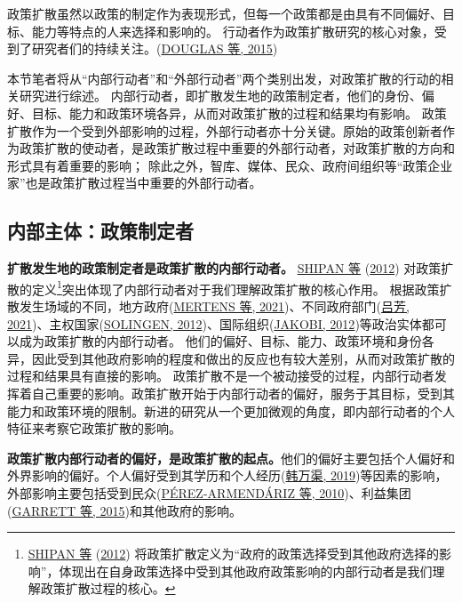 \documentclass[
  12pt,
]{ctexart}
\begin{document}
政策扩散虽然以政策的制定作为表现形式，但每一个政策都是由具有不同偏好、目标、能力等特点的人来选择和影响的。
行动者作为政策扩散研究的核心对象，受到了研究者们的持续关注。(\protect\hyperlink{ref-DouglasEtAl2015}{DOUGLAS 等, 2015})

本节笔者将从``内部行动者''和``外部行动者''两个类别出发，对政策扩散的行动的相关研究进行综述。
内部行动者，即扩散发生地的政策制定者，他们的身份、偏好、目标、能力和政策环境各异，从而对政策扩散的过程和结果均有影响。
政策扩散作为一个受到外部影响的过程，外部行动者亦十分关键。原始的政策创新者作为政策扩散的使动者，是政策扩散过程中重要的外部行动者，对政策扩散的方向和形式具有着重要的影响；
除此之外，智库、媒体、民众、政府间组织等``政策企业家''也是政策扩散过程当中重要的外部行动者。

\hypertarget{ux5185ux90e8ux4e3bux4f53ux653fux7b56ux5236ux5b9aux8005}{%
\subsection{内部主体：政策制定者}\label{ux5185ux90e8ux4e3bux4f53ux653fux7b56ux5236ux5b9aux8005}}

\textbf{扩散发生地的政策制定者是政策扩散的内部行动者。}
\protect\hyperlink{ref-ShipanVolden2012}{SHIPAN 等} (\protect\hyperlink{ref-ShipanVolden2012}{2012}) 对政策扩散的定义\footnote{\protect\hyperlink{ref-ShipanVolden2012}{SHIPAN 等} (\protect\hyperlink{ref-ShipanVolden2012}{2012}) 将政策扩散定义为``政府的政策选择受到其他政府选择的影响''，体现出在自身政策选择中受到其他政府政策影响的内部行动者是我们理解政策扩散过程的核心。}突出体现了内部行动者对于我们理解政策扩散的核心作用。
根据政策扩散发生场域的不同，地方政府(\protect\hyperlink{ref-MertensEtAl2021}{MERTENS 等, 2021})、不同政府部门(\protect\hyperlink{ref-LuFang2021}{吕芳, 2021})、主权国家(\protect\hyperlink{ref-Solingen2012}{SOLINGEN, 2012})、国际组织(\protect\hyperlink{ref-Jakobi2012}{JAKOBI, 2012})等政治实体都可以成为政策扩散的内部行动者。
他们的偏好、目标、能力、政策环境和身份各异，因此受到其他政府影响的程度和做出的反应也有较大差别，从而对政策扩散的过程和结果具有直接的影响。
政策扩散不是一个被动接受的过程，内部行动者发挥着自己重要的影响。政策扩散开始于内部行动者的偏好，服务于其目标，受到其能力和政策环境的限制。新进的研究从一个更加微观的角度，即内部行动者的个人特征来考察它政策扩散的影响。

\textbf{政策扩散内部行动者的偏好，是政策扩散的起点。}他们的偏好主要包括个人偏好和外界影响的偏好。个人偏好受到其学历和个人经历(\protect\hyperlink{ref-HanWanQu2019}{韩万渠, 2019})等因素的影响，外部影响主要包括受到民众(\protect\hyperlink{ref-Perez-ArmendarizCrow2010}{PÉREZ-ARMENDÁRIZ 等, 2010})、利益集团(\protect\hyperlink{ref-GarrettJansa2015}{GARRETT 等, 2015})和其他政府的影响。
\end{document}
